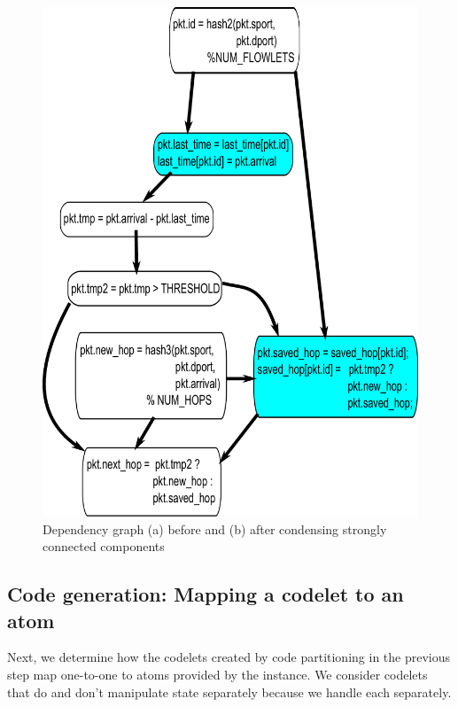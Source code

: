 \begin{figure}[!t]
\begin{minipage}{0.5\textwidth}
\includegraphics[width=\columnwidth]{scc.pdf}
\end{minipage}
\caption{Dependency graph (a) before and (b) after condensing strongly connected components}
\label{fig:partitioning}
\end{figure}

\subsection{Code generation: Mapping a codelet to an atom}
\label{ss:code_gen}
Next, we determine how the codelets created by code partitioning in the
previous step map one-to-one to atoms provided by the \absmachine instance. We
consider codelets that do and don't manipulate state separately because we
handle each separately.

